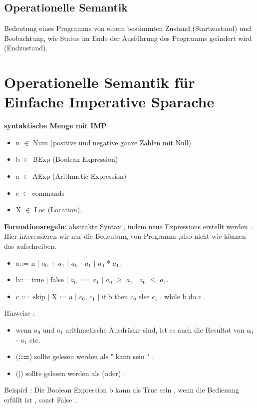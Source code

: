\documentclass[a4paper,12pt,twoside,headsepline]{scrartcl}
\begin{document}
 \subsection{Operationelle Semantik}
Bedeutung eines Programms von einem bestimmten Zustand (Startzustand) und Beobachtung, wie Status im Ende der Ausführung des Programms geändert wird (Endzustand).

\section{Operationelle Semantik für Einfache Imperative Sparache}


	\textbf{syntaktische Menge mit IMP}
		\begin{itemize}
			\item n $\in$ Num   (positive und negative ganze Zahlen mit Null)
			\item b $\in$ BExp  (Boolean Expression)
			\item a $\in$ AExp   (Arithmetic Expression)
			\item c $\in$ commands 
			\item X $\in$ Loc    (Location).
		\end{itemize}
			
	\textbf{Formationsregeln}: abstrakte Syntax , indem neue Expressions erstellt werden .
    Hier interessieren wir nur die Bedeutung von Programm ,also nicht wie können das aufschreiben.
	\begin{itemize}
	
			\item a::= n $\mid$ $a_0$ + $a_1$ $\mid$ $a_0$ - $a_1$ $\mid$ $a_0$ * $a_1$.
			\item b::= true $\mid$ false $\mid$ $a_0$ == $a_1$ $\mid$ $a_0$ $\geq$ $a_1$ $\mid$ $a_0$ $\leq$ $a_1$.    
			\item c ::= skip $\mid$ X := a $\mid$  $c_0$, $c_1$ $\mid$ if b then $c_0$ else $c_1$ $\mid$ while b do c .	
		\end{itemize}
	Hinweise :
	\begin{itemize}
		\item wenn $a_0$ und $a_1$ arithmetische Ausdrücke sind, ist es auch die Resultat von $a_0$ - $a_1$ etc. 
		\item (\textbf{::=}) sollte gelesen werden als " kann sein " .
		\item (\textbf{$\mid$}) sollte gelesen werden als (oder) .
	\end{itemize} 
Beispiel : Die Boolean Expression b kann als True sein , wenn die Bedienung erfüllt ist , sonst False . 
\end{document}
